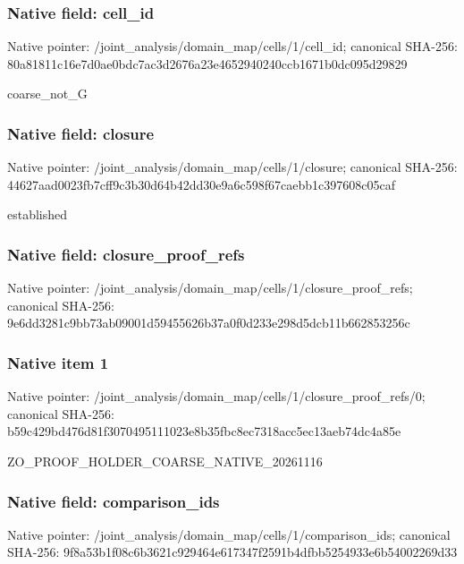 \documentclass[10pt,a4paper]{article}
\begin{document}
\subsubsection{Native field: cell\_\allowbreak{}id}
Native pointer: /joint\_\allowbreak{}analysis/domain\_\allowbreak{}map/cells/1/cell\_\allowbreak{}id; canonical SHA-256: 80a81811c16e7d0ae0bdc7ac3d2676a23e4652940240ccb1671b0dc095d29829

\begingroup\raggedright\sloppy coarse\_\allowbreak{}not\_\allowbreak{}G\par\endgroup

\subsubsection{Native field: closure}
Native pointer: /joint\_\allowbreak{}analysis/domain\_\allowbreak{}map/cells/1/closure; canonical SHA-256: 44627aad0023fb7cff9c3b30d64b42dd30e9a6c598f67caebb1c397608c05caf

\begingroup\raggedright\sloppy established\par\endgroup

\subsubsection{Native field: closure\_\allowbreak{}proof\_\allowbreak{}refs}
Native pointer: /joint\_\allowbreak{}analysis/domain\_\allowbreak{}map/cells/1/closure\_\allowbreak{}proof\_\allowbreak{}refs; canonical SHA-256: 9e6dd3281c9bb73ab09001d59455626b37a0f0d233e298d5dcb11b662853256c

\subsubsection{Native item 1}
Native pointer: /joint\_\allowbreak{}analysis/domain\_\allowbreak{}map/cells/1/closure\_\allowbreak{}proof\_\allowbreak{}refs/0; canonical SHA-256: b59c429bd476d81f3070495111023e8b35fbc8ec7318acc5ec13aeb74dc4a85e

\begingroup\raggedright\sloppy ZO\_\allowbreak{}PROOF\_\allowbreak{}HOLDER\_\allowbreak{}COARSE\_\allowbreak{}NATIVE\_\allowbreak{}20261116\par\endgroup

\subsubsection{Native field: comparison\_\allowbreak{}ids}
Native pointer: /joint\_\allowbreak{}analysis/domain\_\allowbreak{}map/cells/1/comparison\_\allowbreak{}ids; canonical SHA-256: 9f8a53b1f08c6b3621c929464e617347f2591b4dfbb5254933e6b54002269d33
\end{document}
